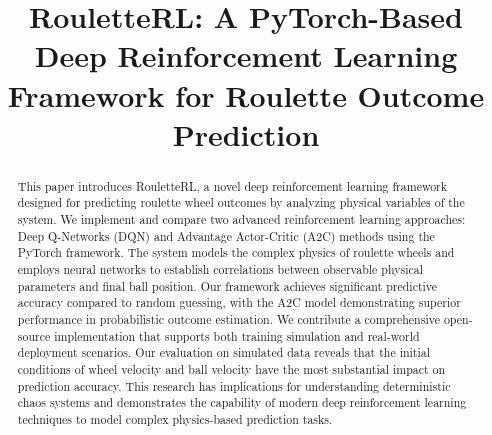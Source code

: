 \documentclass[conference]{IEEEtran}
\begin{document}
\title{RouletteRL: A PyTorch-Based Deep Reinforcement Learning Framework for Roulette Outcome Prediction\\
}

\author{
\and
{}
\and
{}
\and
{}
}

\maketitle

\begin{abstract}
This paper introduces RouletteRL, a novel deep reinforcement learning framework designed for predicting roulette wheel outcomes by analyzing physical variables of the system. We implement and compare two advanced reinforcement learning approaches: Deep Q-Networks (DQN) and Advantage Actor-Critic (A2C) methods using the PyTorch framework. The system models the complex physics of roulette wheels and employs neural networks to establish correlations between observable physical parameters and final ball position. Our framework achieves significant predictive accuracy compared to random guessing, with the A2C model demonstrating superior performance in probabilistic outcome estimation. We contribute a comprehensive open-source implementation that supports both training simulation and real-world deployment scenarios. Our evaluation on simulated data reveals that the initial conditions of wheel velocity and ball velocity have the most substantial impact on prediction accuracy. This research has implications for understanding deterministic chaos systems and demonstrates the capability of modern deep reinforcement learning techniques to model complex physics-based prediction tasks.
\end{abstract}
\end{document}
